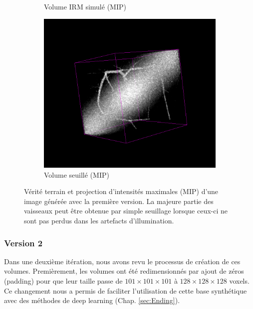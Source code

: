 \begin{figure}[!ht]
\begin{subfigure}{0.45\textwidth}
    \caption{Volume IRM simulé (MIP)}
  \end{subfigure}
  \begin{subfigure}{0.45\textwidth}
    \includegraphics[width=\textwidth]{Images/vascu_v1_thresholding.png}
    \centering
    \caption{Volume seuillé (MIP)}
  \end{subfigure}
  \caption{Vérité terrain et projection d'intensités maximales (MIP) d'une image générée avec la première version. La majeure partie des vaisseaux peut être obtenue par simple seuillage lorsque ceux-ci ne sont pas perdus dans les artefacts d'illumination.}
  \label{fig:vascu_v1_problems}
\end{figure}
\subsubsection{Version 2}
Dans une deuxième itération, nous avons revu le processus de création de ces volumes. Premièrement, les volumes ont été redimensionnés par ajout de zéros (padding) pour que leur taille passe de $101 \times 101 \times 101$ à $128 \times 128 \times 128$ voxels. Ce changement nous a permis de faciliter l'utilisation de cette base synthétique avec des méthodes de deep learning (Chap. \ref{sec:Ending}).
